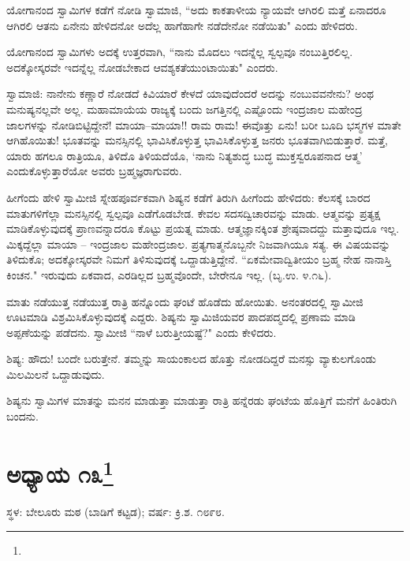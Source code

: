 ಯೋಗಾನಂದ ಸ್ವಾಮಿಗಳ ಕಡೆಗೆ ನೋಡಿ ಸ್ವಾಮಾಜಿ, “ಅದು ಕಾಕತಾಳೀಯ ನ್ಯಾಯವೇ ಆಗಿರಲಿ ಮತ್ತೆ ಏನಾದರೂ ಆಗಿರಲಿ ಆತನು ಏನೇನು ಹೇಳಿದನೋ ಅದೆಲ್ಲ ಹಾಗೆಹಾಗೇ ನಡೆದೇನೋ ನಡೆಯಿತು" ಎಂದು ಹೇಳಿದರು.

ಯೋಗಾನಂದ ಸ್ವಾಮಿಗಳು ಅದಕ್ಕೆ ಉತ್ತರವಾಗಿ, “ನಾನು ಮೊದಲು ಇದನ್ನೆಲ್ಲ ಸ್ವಲ್ಪವೂ ನಂಬುತ್ತಿರಲಿಲ್ಲ. ಅದಕ್ಕೋಸ್ಕರವೇ ಇದನ್ನೆಲ್ಲ ನೋಡಬೇಕಾದ ಆವಶ್ಯಕತೆಯುಂಟಾಯಿತು" ಎಂದರು.

ಸ್ವಾಮಾಜಿ: ನಾನೇನು ಕಣ್ಣಾರೆ ನೋಡದೆ ಕಿವಿಯಾರೆ ಕೇಳದೆ ಯಾವುದೆಂದರೆ ಅದನ್ನು ನಂಬುವವನೇನು? ಅಂಥ ಮನುಷ್ಯನಲ್ಲವೇ ಅಲ್ಲ. ಮಹಾಮಾಯೆಯ ರಾಜ್ಯಕ್ಕೆ ಬಂದು ಜಗತ್ತಿನಲ್ಲಿ ಎಷ್ಟೊಂದು ಇಂದ್ರಜಾಲ ಮಹೇಂದ್ರ ಜಾಲಗಳನ್ನು ನೋಡಿಬಿಟ್ಟಿದ್ದೇನೆ! ಮಾಯಾ–ಮಾಯಾ!! ರಾಮ ರಾಮ! ಈವೊತ್ತು ಏನು! ಬರೀ ಬೂದಿ ಭಸ್ಮಗಳ ಮಾತೇ ಆಗಿಹೊಯಿತು! ಭೂತವನ್ನು ಮನಸ್ಸಿನಲ್ಲಿ ಭಾವಿಸಿಕೊಳ್ಳುತ್ತ ಭಾವಿಸಿಕೊಳ್ಳುತ್ತ ಜನರು ಭೂತವಾಗಿಬಿಡುತ್ತಾರೆ. ಮತ್ತೆ, ಯಾರು ಹಗಲೂ ರಾತ್ರಿಯೂ, ತಿಳಿದೊ ತಿಳಿಯದೆಯೊ, ‘ನಾನು ನಿತ್ಯಶುದ್ಧ ಬುದ್ಧ ಮುಕ್ತಸ್ವರೂಪನಾದ ಆತ್ಮ’ ಎಂದುಕೊಳ್ಳುತ್ತಾರೆಯೋ ಅವರು ಬ್ರಹ್ಮಜ್ಞರಾಗುವರು.

ಹೀಗೆಂದು ಹೇಳಿ ಸ್ವಾಮೀಜಿ ಸ್ನೇಹಪೂರ್ವಕವಾಗಿ ಶಿಷ್ಯನ ಕಡೆಗೆ ತಿರುಗಿ ಹೀಗೆಂದು ಹೇಳಿದರು: ಕೆಲಸಕ್ಕೆ ಬಾರದ ಮಾತುಗಳಿಗೆಲ್ಲಾ ಮನಸ್ಸಿನಲ್ಲಿ ಸ್ವಲ್ಪವೂ ಎಡೆಗೊಡಬೇಡ. ಕೇವಲ ಸದಸದ್ವಿಚಾರವನ್ನು ಮಾಡು. ಆತ್ಮವನ್ನು ಪ್ರತ್ಯಕ್ಷ ಮಾಡಿಕೊಳ್ಳುವುದಕ್ಕೆ ಪ್ರಾಣವನ್ನಾದರೂ ಕೊಟ್ಟು ಪ್ರಯತ್ನ ಮಾಡು. ಆತ್ಮಜ್ಞಾನಕ್ಕಿಂತ ಶ್ರೇಷ್ಠವಾದದ್ದು ಮತ್ತಾವುದೂ ಇಲ್ಲ. ಮಿಕ್ಕದ್ದೆಲ್ಲಾ ಮಾಯಾ – ಇಂದ್ರಜಾಲ ಮಹೇಂದ್ರಜಾಲ. ಪ್ರತ್ಯಗಾತ್ಮನೊಬ್ಬನೇ ನಿಜವಾಗಿಯೂ ಸತ್ಯ. ಈ ವಿಷಯವನ್ನು ತಿಳಿದುಕೊ; ಅದಕ್ಕೋಸ್ಕರವೇ ನಿಮಗೆ ತಿಳಿಸುವುದಕ್ಕೆ ಒದ್ದಾಡುತ್ತಿದ್ದೇನೆ. “ಏಕಮೇವಾದ್ವಿತೀಯಂ ಬ್ರಹ್ಮ ನೇಹ ನಾನಾಸ್ತಿ ಕಿಂಚನ." ಇರುವುದು ಏಕವಾದ, ಎರಡಿಲ್ಲದ ಬ್ರಹ್ಮವೊಂದೇ, ಬೇರೇನೂ ಇಲ್ಲ. (ಬೃ.ಉ. ೪.೧೬).

ಮಾತು ನಡೆಯುತ್ತ ನಡೆಯುತ್ತ ರಾತ್ರಿ ಹನ್ನೊಂದು ಘಂಟೆ ಹೊಡೆದು ಹೋಯಿತು. ಅನಂತರದಲ್ಲಿ ಸ್ವಾಮೀಜಿ ಊಟಮಾಡಿ ವಿಶ್ರಮಿಸಿಕೊಳ್ಳುವುದಕ್ಕೆ ಎದ್ದರು. ಶಿಷ್ಯನು ಸ್ವಾಮಿಜಿಯವರ ಪಾದಪದ್ಮದಲ್ಲಿ ಪ್ರಣಾಮ ಮಾಡಿ ಅಪ್ಪಣೆಯನ್ನು ಪಡೆದನು. ಸ್ವಾಮೀಜಿ “ನಾಳೆ ಬರುತ್ತೀಯಷ್ಟೆ?" ಎಂದು ಕೇಳಿದರು.

ಶಿಷ್ಯ: ಹೌದು! ಬಂದೇ ಬರುತ್ತೇನೆ. ತಮ್ಮನ್ನು ಸಾಯಂಕಾಲದ ಹೊತ್ತು ನೋಡದಿದ್ದರೆ ಮನಸ್ಸು ವ್ಯಾಕುಲಗೊಂಡು ಮಿಲಮಿಲನೆ ಒದ್ದಾಡುವುದು.

ಶಿಷ್ಯನು ಸ್ವಾಮಿಗಳ ಮಾತನ್ನು ಮನನ ಮಾಡುತ್ತಾ ಮಾಡುತ್ತಾ ರಾತ್ರಿ ಹನ್ನೆರಡು ಘಂಟೆಯ ಹೊತ್ತಿಗೆ ಮನೆಗೆ ಹಿಂತಿರುಗಿ ಬಂದನು.

\newpage

\chapter[ಅಧ್ಯಾಯ ೧೩]{ಅಧ್ಯಾಯ ೧೩\protect\footnote{}}

\centerline{ಸ್ಥಳ: ಬೇಲೂರು ಮಠ (ಬಾಡಿಗೆ ಕಟ್ಟಡ); ವರ್ಷ: ಕ್ರಿ.ಶ. ೧೮೯೮.}


